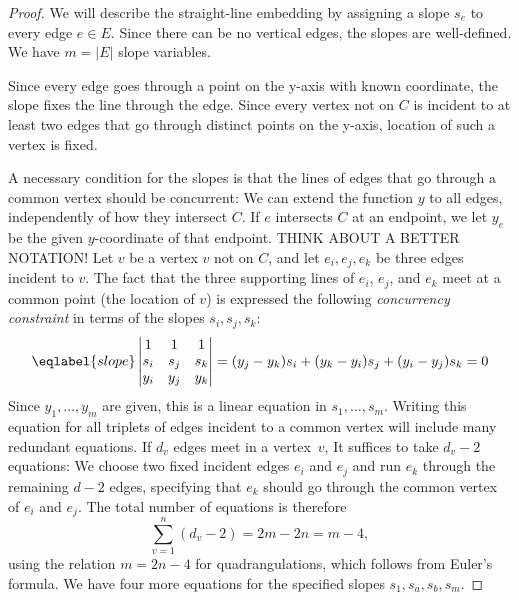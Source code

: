 \begin{proof}
  We will describe the straight-line embedding by assigning a slope $s_e$
to every edge $e\in E$.
Since there can be no vertical edges, the slopes are well-defined.
We have $m=|E|$ slope variables.

Since every edge goes through a point on the y-axis with known
coordinate, the slope fixes the line through the edge.
 Since
every vertex not on $C$ is incident to at least two edges that go
through
distinct points on the y-axis, location of such a vertex is fixed.

A necessary condition for the slopes is that the lines of edges that
go through a common vertex should be concurrent:
We can extend the function $y$ to all edges, independently of how they
intersect $C$. If $e$ intersects $C$ at an endpoint, we let $y_e$ be
the
given $y$-coordinate of that endpoint. THINK ABOUT A BETTER NOTATION!
%
Let $v$ be a vertex $v$ not on $C$, and let $e_i, e_j, e_k$ be three
edges incident to $v$.
The fact that the three supporting lines of $e_i$, $e_j$, and $e_k$ 
meet at a common point (the location of $v$) is expressed
the following \emph{concurrency constraint} 
in terms of the slopes $s_i,s_j,s_k$:
\begin{equation}\eqlabel{slope} 
\left|
  \begin{matrix}
    1&1&1\\
s_i&s_j&s_k\\
y_i&y_j&y_k
  \end{matrix}
\right|=
   ({y_j-y_k}) s_i + ({y_k-y_i}) s_j 
          + ({y_i-y_j})s_k  = 0
\end{equation}
Since $y_1,\ldots,y_m$ are given, this is a linear equation
in $s_1,\ldots,s_m$.
Writing this equation for all triplets of edges incident to a common
vertex will include many redundant equations.
If $d_v$ edges meet in a vertex~$v$, 
 It suffices to take $d_v-2$ equations: We choose two fixed
incident edges $e_i$ and $e_j$ and run $e_k$ through the remaining
$d-2$ edges, specifying that $e_k$ should go through the common vertex
of $e_i$ and $e_j$.  The total number of equations is therefore
\begin{equation}
  \label{eq:number-equations}
  \sum_{v=1}^n(d_v-2) = 2m-2n = m-4,
\end{equation}
using the relation $m=2n-4$ for quadrangulations, which follows from
Euler's formula.
 We have four more equations for the specified slopes
$s_1, s_a, s_b, s_m$.
%


\end{proof}




